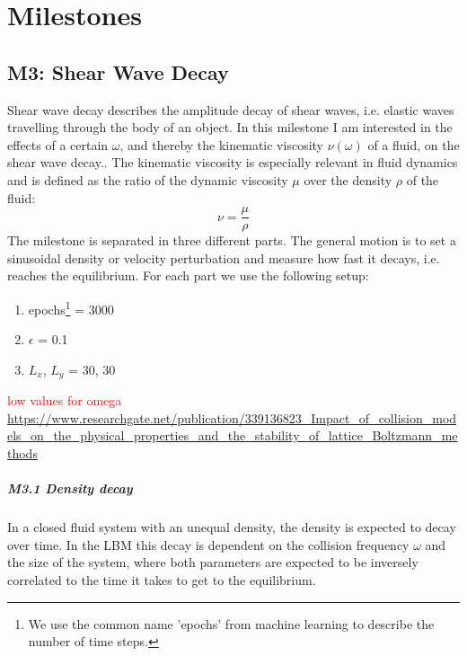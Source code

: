 \documentclass[a4paper,11pt, oneside]{book}
\begin{document}
\chapter{Milestones}
\section{M3: Shear Wave Decay}
Shear wave decay describes the amplitude decay of shear waves, i.e. elastic waves travelling through the body of an object.
In this milestone I am interested in the effects of a certain $\omega$, and thereby the kinematic viscosity $\nu(\omega)$ of a fluid, on the shear wave decay..
The kinematic viscosity is especially relevant in fluid dynamics and is defined as the ratio of the dynamic viscosity $\mu$ over the density $\rho$ of the fluid:
\begin{equation}
\nu = \frac{\mu}{\rho}
\end{equation}
The milestone is separated in three different parts. 
The general motion is to set a sinusoidal density or velocity
perturbation and measure how fast it decays, i.e. reaches the equilibrium.
For each part we use the following setup:
\begin{enumerate}
    \item epochs\footnote{We use the common name 'epochs' from machine learning to describe the number of time steps. } = 3000
    \item $\epsilon$ = 0.1
    \item $L_{x}$, $L_{y}$ = 30, 30
\end{enumerate}

\textcolor{red}{low values for omega \url{https://www.researchgate.net/publication/339136823_Impact_of_collision_models_on_the_physical_properties_and_the_stability_of_lattice_Boltzmann_methods}}

\paragraph{M3.1 Density decay} 
In a closed fluid system with an unequal density, the density is expected to decay over time. In the LBM this decay is dependent on the collision frequency $\omega$ and the size of the system, where both parameters are expected to be inversely correlated to the time it takes to get to the equilibrium.
\end{document}
